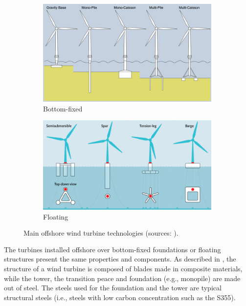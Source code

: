 \begin{figure}
    \begin{subfigure}[b]{0.48\textwidth}
        \centering
        \includegraphics[width=\linewidth]{./part1/figures/bottom_fixed_techno.png}
        \caption{Bottom-fixed}
        \label{fig:FOWT_bottomfixed}
    \end{subfigure}
    \begin{subfigure}[b]{0.48\textwidth}
        \centering
        \includegraphics[width=\linewidth]{./part1/figures/Floating-wind-platform-categories.png}
        \caption{Floating}
        \label{fig:FOWT_floating}
    \end{subfigure}
    \caption{Main offshore wind turbine technologies (sources: \citealt{ahmed_2015_bottomfixed_image,mei_2021_FOWT_illustration}).}
\end{figure}



The turbines installed offshore over bottom-fixed foundations or floating structures present the same properties and components. 
As described in , the structure of a wind turbine is composed of blades made in composite materials, while the tower, the transition peace and foundation (e.g., monopile) are made out of steel. 
The steels used for the foundation and the tower are typical structural steels (i.e., steels with low carbon concentration such as the S355). 

